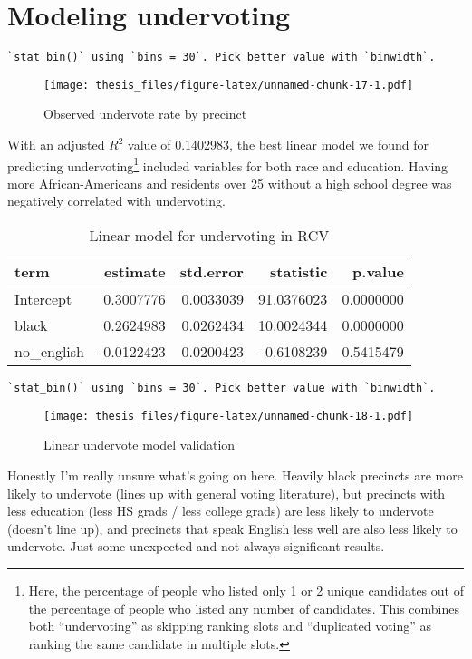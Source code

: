 \documentclass[12pt,twoside]{reedthesis}
\begin{document}
\hypertarget{modeling-undervoting}{%
\section{Modeling undervoting}\label{modeling-undervoting}}
\begin{verbatim}
`stat_bin()` using `bins = 30`. Pick better value with `binwidth`.
\end{verbatim}
\begin{figure}
\centering
\texttt{[image: thesis\_files/figure-latex/unnamed-chunk-17-1.pdf]}
\caption{\label{fig:unnamed-chunk-17}Observed undervote rate by precinct}
\end{figure}
With an adjusted \(R^2\) value of 0.1402983, the best linear model we found for predicting undervoting\footnote{Here, the percentage of people who listed only 1 or 2 unique candidates out of the percentage of people who listed any number of candidates. This combines both ``undervoting'' as skipping ranking slots and ``duplicated voting'' as ranking the same candidate in multiple slots.} included variables for both race and education. Having more African-Americans and residents over 25 without a high school degree was negatively correlated with undervoting.
\begin{longtable}{lrrrr}
\caption[Linear undervote model]{\label{tab:unnamed-chunk-18}Linear model for undervoting in RCV}\\
\toprule
term & estimate & std.error & statistic & p.value\\
\midrule
Intercept & 0.3007776 & 0.0033039 & 91.0376023 & 0.0000000\\
black & 0.2624983 & 0.0262434 & 10.0024344 & 0.0000000\\
no\_english & -0.0122423 & 0.0200423 & -0.6108239 & 0.5415479\\
\bottomrule
\end{longtable}
\begin{verbatim}
`stat_bin()` using `bins = 30`. Pick better value with `binwidth`.
\end{verbatim}
\begin{figure}
\centering
\texttt{[image: thesis\_files/figure-latex/unnamed-chunk-18-1.pdf]}
\caption{\label{fig:unnamed-chunk-18}Linear undervote model validation}
\end{figure}
Honestly I'm really unsure what's going on here. Heavily black precincts are more likely to undervote (lines up with general voting literature), but precincts with less education (less HS grads / less college grads) are less likely to undervote (doesn't line up), and precincts that speak English less well are also less likely to undervote. Just some unexpected and not always significant results.
\end{document}
